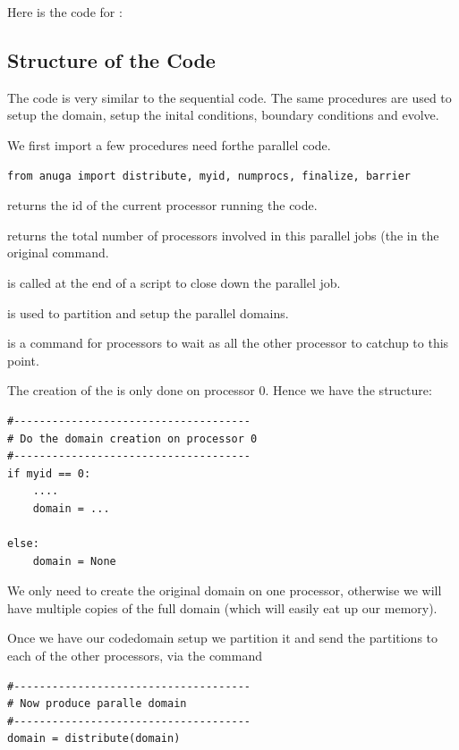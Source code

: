 \documentclass{manual}
\begin{document}
Here is the code for :



\subsection{Structure of the Code}

The code is very similar to the sequential code. The same procedures are used to setup the domain, setup the inital conditions, boundary conditions and evolve. 


We first import a few procedures  need forthe parallel code.
\begin{verbatim}
from anuga import distribute, myid, numprocs, finalize, barrier
\end{verbatim}

 returns the id of the current processor running the code. 

 returns the total number of processors involved in this parallel jobs (the  in the original  command. 

 is called at the end of a script to close down the parallel job.

 is used to partition and setup the parallel domains.

 is a command for processors to wait as all the other processor to catchup to this point.




The creation of the  is only done on processor 0. Hence we have the structure:

\begin{verbatim}
#-------------------------------------
# Do the domain creation on processor 0
#-------------------------------------
if myid == 0: 
	....
	domain = ...
	
else:
	domain = None
\end{verbatim}

We only need to create the original domain on one processor, otherwise we will have multiple copies of the full domain (which will easily eat up our memory). 

Once we have our code{domain} setup we partition it and send the partitions to each of the other processors, via the command

\begin{verbatim}
#-------------------------------------
# Now produce paralle domain
#-------------------------------------
domain = distribute(domain)
\end{verbatim}
\end{document}
